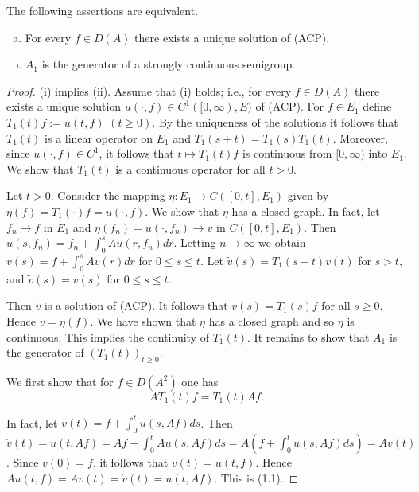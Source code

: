\begin{theorem}\label{thm:1.1}
The following assertions are equivalent.
\begin{enumerate}[(a)]
\item For every $f \in D(A)$ there exists a unique solution of (ACP).
\item $A_{1}$ is the generator of a strongly continuous semigroup.
\end{enumerate}
\end{theorem}

\begin{proof}
(i) implies (ii).
Assume that (i) holds; i.e., for every $f \in D(A)$ there exists a unique solution $u(\cdot,f) \in C^{1}([0,\infty),E)$ of (ACP).
For $f \in E_{1}$ define $T_{1}(t)f := u(t,f)$ $(t\geq0)$.
By the uniqueness of the solutions it follows that $T_{1}(t)$ is a linear operator on $E_{1}$ and $T_{1}(s+t) = T_{1}(s)T_{1}(t)$.
Moreover, since $u(\cdot,f) \in C^{1}$, it follows that $t \mapsto T_{1}(t)f$ is continuous from $[0,\infty)$ into $E_{1}$.
We show that $T_{1}(t)$ is a continuous operator for all $t>0$.

Let $t>0$.
Consider the mapping $\eta: E_{1} \to C([0,t],E_{1})$ given by $\eta(f) = T_{1}(\cdot)f = u(\cdot,f)$.
We show that $\eta$ has a closed graph.
In fact, let $f_{n} \to f$ in $E_{1}$ and $\eta(f_{n}) = u(\cdot,f_{n}) \to v$ in $C([0,t],E_{1})$.
Then $u(s,f_{n}) = f_{n} + \int_0^s Au(r,f_{n})dr$.
Letting $n\to\infty$ we obtain $v(s) = f + \int_0^s Av(r)dr$ for $0 \leq s \leq t$.
Let $\tilde{v}(s) = T_{1}(s-t)v(t)$ for $s > t$, and $\tilde{v}(s) = v(s)$ for $0 \leq s \leq t$.



Then $\tilde{v}$ is a solution of (ACP).
It follows that $\tilde{v}(s) = T_{1}(s)f$ for all $s \geq 0$.
Hence $v = \eta(f)$.
We have shown that $\eta$ has a closed graph and so $\eta$ is continuous.
This implies the continuity of $T_{1}(t)$.
It remains to show that $A_{1}$ is the generator of $(T_{1}(t))_{t\geq0}$.

We first show that for $f \in D(A^{2})$ one has
\[
AT_{1}(t)f = T_{1}(t)Af. \tag{1.1}
\]

In fact, let $v(t) = f + \int_{0}^{t} u(s,Af) ds$.
Then $\dot{v}(t) = u(t,Af) = Af + \int_{0}^{t} Au(s,Af) ds = A(f + \int_{0}^{t} u(s,Af) ds) = Av(t)$.
Since $v(0) = f$, it follows that $v(t) = u(t,f)$.
Hence $Au(t,f) = Av(t) = \dot{v}(t) = u(t,Af)$.
This is (1.1).


\end{proof}
